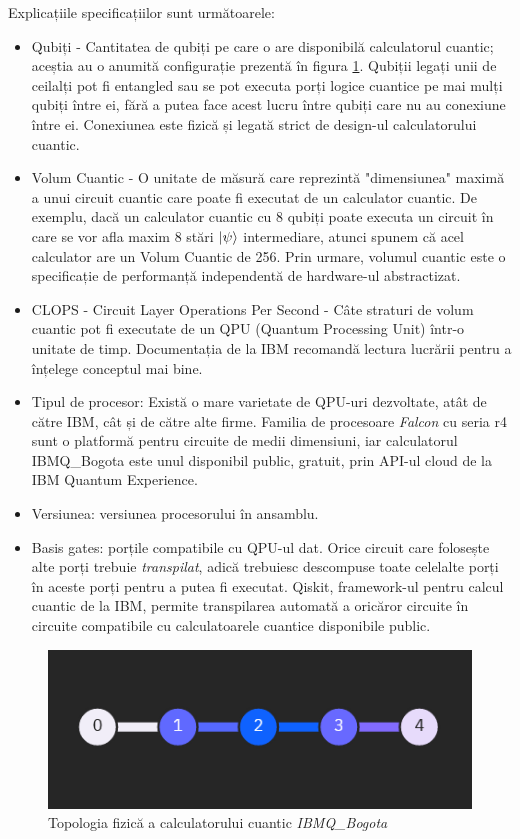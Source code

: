 Explicațiile specificațiilor sunt următoarele:
\begin{itemize}
    \item Qubiți - Cantitatea de qubiți pe care o are disponibilă calculatorul cuantic; aceștia au o anumită configurație prezentă în figura \ref{fig:TopologieBogota}. Qubiții legați unii de ceilalți pot fi entangled sau se pot executa porți logice cuantice pe mai mulți qubiți între ei, fără a putea face acest lucru între qubiți care nu au conexiune între ei. Conexiunea este fizică și legată strict de design-ul calculatorului cuantic.
    \item Volum Cuantic - O unitate de măsură care reprezintă "dimensiunea" maximă a unui circuit cuantic care poate fi executat de un calculator cuantic. De exemplu, dacă un calculator cuantic cu 8 qubiți poate executa un circuit în care se vor afla maxim 8 stări $\ket{\psi}$ intermediare, atunci spunem că acel calculator are un Volum Cuantic de 256. Prin urmare, volumul cuantic este o specificație de performanță independentă de hardware-ul abstractizat.
    \item CLOPS - Circuit Layer Operations Per Second - Câte straturi de volum cuantic pot fi executate de un QPU (Quantum Processing Unit) într-o unitate de timp. Documentația de la IBM \cite{misc:web:DocumentatieIBMQ} recomandă lectura lucrării \cite{misc:paper:QSS:WackAndrewEtAl} pentru a înțelege conceptul mai bine.
    \item Tipul de procesor: Există o mare varietate de QPU-uri dezvoltate, atât de către IBM, cât și de către alte firme. Familia de procesoare \textit{Falcon} cu seria r4 sunt o platformă pentru circuite de medii dimensiuni, iar calculatorul IBMQ\_Bogota este unul disponibil public, gratuit, prin API-ul cloud de la IBM Quantum Experience.
    \item Versiunea: versiunea procesorului în ansamblu.
    \item Basis gates: porțile compatibile cu QPU-ul dat. Orice circuit care folosește alte porți trebuie \textit{transpilat}, adică trebuiesc descompuse toate celelalte porți în aceste porți pentru a putea fi executat. Qiskit, framework-ul pentru calcul cuantic de la IBM, permite transpilarea automată a oricăror circuite în circuite compatibile cu calculatoarele cuantice disponibile public.
\end{itemize}

\begin{figure}[H]
    \centering
    \includegraphics{anexe/figuri/TopologieBogota.png}
    \caption{Topologia fizică a calculatorului cuantic \textit{IBMQ\_Bogota} }
    \label{fig:TopologieBogota}
\end{figure}

